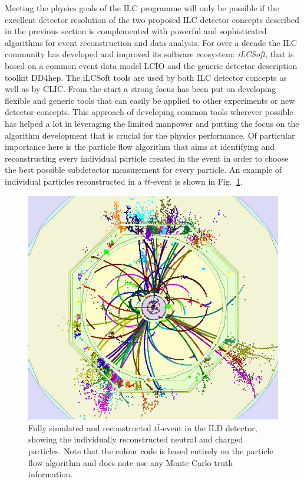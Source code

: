 \documentclass[%
 reprint,
 amsmath,amssymb,
 aps,
]{revtex4-1}
\def\Fig#1{Fig.~\ref{#1}}
\begin{document}
Meeting the physics goals of the ILC programme will only be possible if the excellent detector resolution
of the two proposed ILC detector concepts described in the previous section is complemented with powerful
and sophisticated algorithms for event reconstruction and data analysis.
For over a decade the ILC community has developed and improved its software ecosystem: \emph{iLCSoft}\cite{bib:ilcsoft}, that
is based on a common event data model LCIO\cite{bib:lcio} and the generic detector description toolkit DD4hep\cite{bib:dd4hep}. 
The iLCSoft tools are used by both ILC detector concepts as well as by CLIC.
From the start a strong focus has been put on developing flexible and generic tools that can easily be applied
to other experiments or new detector concepts. This approach of developing common tools wherever possible
has helped a lot in leveraging the limited manpower and putting the focus on the algorithm development that
is crucial for the physics performance. Of particular importance here is the particle flow algorithm that aims at identifying
and reconstructing every individual particle created in the event in order to choose the best possible subdetector measurement for every particle. 
An example of individual particles reconstructed in a $t\bar t$-event is shown in \Fig{fig:ttbarevent}.
\begin{figure}
\begin{center}
\includegraphics[width=0.95\hsize]{figures/ttbar_event_ILD.jpg}
\end{center}
\caption{Fully simulated and reconstructed $t\bar t$-event in the ILD detector, showing the individually reconstructed neutral and charged particles. Note that the colour code is based entirely on the particle flow algorithm and does note use any Monte Carlo truth information.}
\label{fig:ttbarevent}
\end{figure}
\end{document}
